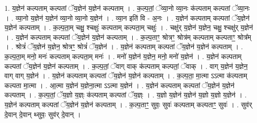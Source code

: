 \documentclass[17pt]{extarticle}
\begin{document}
1. य॒ज्ञेन॑ कल्पताम् कल्पतां ॅय॒ज्ञेन॑ य॒ज्ञेन॑ कल्पताम् । . क॒ल्प॒तां॒ ॅव्या॒नो व्या॒नः क॑ल्पताम् कल्पतां ॅव्या॒नः । . व्या॒नो य॒ज्ञेन॑ य॒ज्ञेन॑ व्या॒नो व्या॒नो य॒ज्ञेन॑ । . व्या॒न इति॑ वि - अ॒नः । . य॒ज्ञेन॑ कल्पताम् कल्पतां ॅय॒ज्ञेन॑ य॒ज्ञेन॑ कल्पताम् । . क॒ल्प॒ता॒म् चक्षु॒ श्चक्षुः॑ कल्पताम् कल्पता॒म् चक्षुः॑ । . चक्षु॑र् य॒ज्ञेन॑ य॒ज्ञेन॒ चक्षु॒ श्चक्षु॑र् य॒ज्ञेन॑ । . य॒ज्ञेन॑ कल्पताम् कल्पतां ॅय॒ज्ञेन॑ य॒ज्ञेन॑ कल्पताम् । . क॒ल्प॒ताꣳ॒॒ श्रोत्रꣳ॒॒ श्रोत्र॑म् कल्पताम् कल्पताꣳ॒॒ श्रोत्र᳚म् । . श्रोत्रं॑ ॅय॒ज्ञेन॑ य॒ज्ञेन॒ श्रोत्रꣳ॒॒ श्रोत्रं॑ ॅय॒ज्ञेन॑ । . य॒ज्ञेन॑ कल्पताम् कल्पतां ॅय॒ज्ञेन॑ य॒ज्ञेन॑ कल्पताम् । . क॒ल्प॒ता॒म् मनो॒ मनः॑ कल्पताम् कल्पता॒म् मनः॑ । . मनो॑ य॒ज्ञेन॑ य॒ज्ञेन॒ मनो॒ मनो॑ य॒ज्ञेन॑ । . य॒ज्ञेन॑ कल्पताम् कल्पतां ॅय॒ज्ञेन॑ य॒ज्ञेन॑ कल्पताम् । . क॒ल्प॒तां॒ ॅवाग् वाक् क॑ल्पताम् कल्पतां॒ ॅवाक् । . वाग् य॒ज्ञेन॑ य॒ज्ञेन॒ वाग् वाग् य॒ज्ञेन॑ । . य॒ज्ञेन॑ कल्पताम् कल्पतां ॅय॒ज्ञेन॑ य॒ज्ञेन॑ कल्पताम् । . क॒ल्प॒ता॒ मा॒त्मा ऽऽत्मा क॑ल्पताम् कल्पता मा॒त्मा । . आ॒त्मा य॒ज्ञेन॑ य॒ज्ञेना॒त्मा ऽऽत्मा य॒ज्ञेन॑ । . य॒ज्ञेन॑ कल्पताम् कल्पतां ॅय॒ज्ञेन॑ य॒ज्ञेन॑ कल्पताम् । . क॒ल्प॒तां॒ ॅय॒ज्ञो य॒ज्ञ्ः क॑ल्पताम् कल्पतां ॅय॒ज्ञ्ः । . य॒ज्ञो य॒ज्ञेन॑ य॒ज्ञेन॑ य॒ज्ञो य॒ज्ञो य॒ज्ञेन॑ । . य॒ज्ञेन॑ कल्पताम् कल्पतां ॅय॒ज्ञेन॑ य॒ज्ञेन॑ कल्पताम् । . क॒ल्प॒ताꣳ॒॒ सुवः॒ सुवः॑ कल्पताम् कल्पताꣳ॒॒ सुवः॑ । . सुव॑र् दे॒वान् दे॒वान् थ्सुवः॒ सुव॑र् दे॒वान् । \newline
\end{document}
